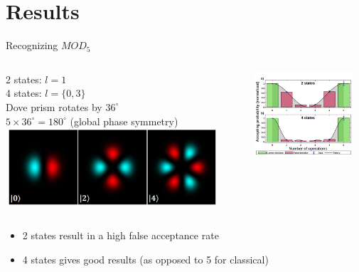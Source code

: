 \documentclass[aspectratio=169,9pt]{beamer}
\begin{document}
\section{Results}
\begin{frame}[t]{Recognizing $MOD_5$}
  \begin{columns}
    \begin{column}{0.5\textwidth}
      2 states: $l=1$\\
      4 states: $l=\{0,3\}$\\
      Dove prism rotates by $36^{\circ}$ \\
      $5 \times 36^{\circ} = 180^{\circ}$ (global phase symmetry)
      \includegraphics[width=0.9\textwidth]{multi_qbit_photon_states.png}
    \end{column}
    \begin{column}{0.5\textwidth}
      \includegraphics[width=0.9\textwidth]{2states_4states.png}
    \end{column}
  \end{columns}
  \begin{itemize}
    \item 2 states result in a high false acceptance rate
    \item 4 states gives good results (as opposed to 5 for classical)
  \end{itemize}
\end{frame}
\end{document}

